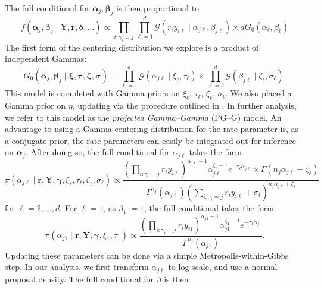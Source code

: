 The full conditional for $\bm{\alpha}_j,\bm{\beta}_j$ is then proportional to
\begin{equation}
    f(\bm{\alpha}_j,\bm{\beta}_j\mid \bm{Y},\bm{r},\bm{\delta},\ldots) \propto \prod_{i:\gamma_i = j}\prod_{\ell = 1}^d\mathcal{G}\left(r_iy_{i\ell}\mid\alpha_{j\ell},\beta_{j\ell}\right) \times dG_0(\alpha_{\ell},\beta_{\ell})
\end{equation}
The first form of the centering distribution we explore is a product of independent Gammas:
\begin{equation}
    G_0(\bm{\alpha}_j,\bm{\beta}_j\mid \bm{\xi},\bm{\tau},\bm{\zeta},\bm{\sigma}) = \prod_{\ell = 1}^d\mathcal{G}(\alpha_{j\ell}\mid \xi_{\ell},\tau_{\ell})\times\prod_{\ell = 2}^d\mathcal{G}(\beta_{j\ell}\mid\zeta_{\ell},\sigma_{\ell}).
\end{equation}
This model is completed with Gamma priors on $\xi_{\ell}$, $\tau_{\ell}$, $\zeta_{\ell}$, $\sigma_{\ell}$.  We also placed a Gamma prior on $\eta$, updating via the procedure outlined in \cite{escobar1995}.  In further analysis, we refer to this model as the \emph{projected Gamma--Gamma} (PG--G) model.  An advantage to using a Gamma centering distribution for the rate parameter is, as a conjugate prior, the rate parameters can easily be integrated out for inference on $\bm{\alpha}_j$.  After doing so, the full conditional for $\alpha_{j\ell}$ takes the form
\begin{equation}
    \pi(\alpha_{j\ell}\mid \bm{r},\bm{Y},\bm{\gamma},\xi_\ell,\tau_\ell,\zeta_\ell,\sigma_\ell) \propto \frac{\left(\prod_{i:\gamma_i = j}r_iy_{i\ell}\right)^{\alpha_{j\ell} - 1}\alpha_{j\ell}^{\xi_\ell - 1}e^{-\tau_\ell \alpha_{j\ell}}\times\Gamma\left(n_j\alpha_{j\ell} + \zeta_{\ell}\right)}{\Gamma^{n_j}(\alpha_{j\ell})\left(\sum_{i:\gamma_i = j}r_iy_{i\ell} + \sigma_{\ell}\right)^{n_j\alpha_{j\ell} + \zeta_{\ell}}}
\end{equation}
for $\ell = 2,\ldots,d$.  For $\ell = 1$, as $\beta_{1} := 1$, the full conditional takes the form
\begin{equation}
    \label{eqn:alpha1update}
    \pi(\alpha_{j1}\mid\bm{r},\bm{Y},\bm{\gamma},\xi_1,\tau_1) \propto \frac{\left(\prod_{i:\gamma_i = j}r_iy_{i1}\right)^{\alpha_{j1} - 1}\alpha_{j1}^{\zeta_1 - 1}e^{-\tau_1\alpha_{j1}}}{\Gamma^{n_j}(\alpha_{j1})}.
\end{equation}
Updating these parameters can be done via a simple Metropolis-within-Gibbs step.  In our analysis, we first transform $\alpha_{j\ell}$ to log scale, and use a normal proposal density.
The full conditional for $\beta$ is then
